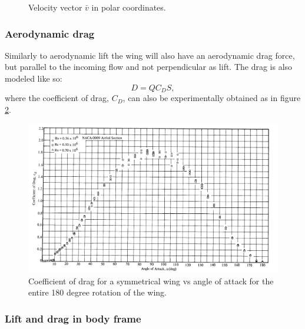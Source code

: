 \begin{figure}[h]
    \center
    
    \caption{Velocity vector $\bar{v}$ in polar coordinates.}
    \label{polar}
\end{figure}

\subsubsection{Aerodynamic drag}
Similarly to aerodynamic lift the wing will also have an aerodynamic drag force, but parallel to the incoming flow and not perpendicular as lift.
The drag is also modeled like so:
\begin{equation}
    D = Q C_D S,
\end{equation}
where the coefficient of drag, $C_D$, can also be experimentally obtained as in figure \ref{drag}.

\begin{figure}[h]
    \center
    \includegraphics[scale=0.2]{drag180.png}
    \caption{Coefficient of drag for a symmetrical wing vs angle of attack for the entire 180 degree rotation of the wing. \cite{aoa180}}
    \label{drag}
\end{figure}


\subsubsection{Lift and drag in body frame}

